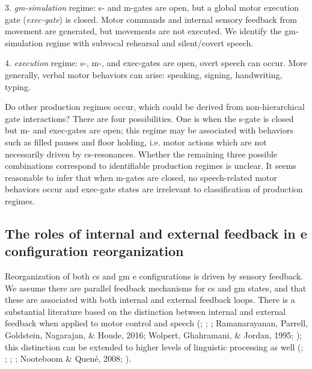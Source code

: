 3. \textit{gm-simulation} regime: s- and m-gates are open,  but a global motor execution gate (\textit{exec-gate}) is closed. Motor commands and internal sensory feedback from movement are generated, but movements are not executed. We identify the gm-simulation regime with subvocal rehearsal and silent/covert speech. 

4. \textit{execution} regime: s-, m-, and exec-gates are open, overt speech can occur. More generally, verbal motor behaviors can arise: speaking, signing, handwriting, typing.

  Do other production regimes occur, which could  be derived from non-hierarchical gate interactions? There are four possibilities. One is when the s-gate is closed but m- and exec-gates are open; this regime may be associated with behaviors such as filled pauses and floor holding, i.e. motor actions which are not necessarily driven by cs-resonances. Whether the remaining three possible combinations correspond to identifiable production regimes is unclear. It seems reasonable to infer that when m-gates are closed, no speech-related motor behaviors occur and exec-gate states are irrelevant to classification of production regimes.

\subsection{The roles of internal and external feedback in e configuration reorganization}

Reorganization of both cs and gm e configurations is driven by sensory feedback. We assume there are parallel feedback mechanisms for cs and gm states, and that these are associated with both internal and external feedback loops. There is a substantial literature based on the distinction between internal and external feedback when applied to motor control and speech (\citealt{Hickok2012}; \citealt{Kawato1999}; \citealt{MiallWolpert1996}; Ramanarayanan, Parrell, Goldstein, Nagarajan, \& Houde, 2016; Wolpert, Ghahramani, \& Jordan, 1995; \citealt{WolpertKawato1998}); this distinction can be extended to higher levels of linguistic processing as well (\citealt{HagoortLevelt2009}; \citealt{Laver1973}; \citealt{Levelt1983,Levelt1989}; \citealt{Nooteboom1973}; Nooteboom \& Quené, 2008; \citealt{Postma2000}).

